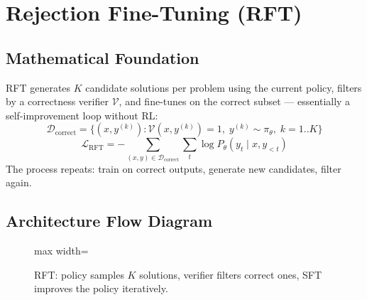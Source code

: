 \documentclass{article}
\begin{document}
\newpage
\section{Rejection Fine-Tuning (RFT)}

\subsection{Mathematical Foundation}
RFT generates $K$ candidate solutions per problem using the current policy, filters by a correctness verifier $\mathcal{V}$, and fine-tunes on the correct subset — essentially a self-improvement loop without RL:
\begin{equation}
  \mathcal{D}_{\text{correct}} = \{(x, y^{(k)}) : \mathcal{V}(x, y^{(k)}) = 1,\; y^{(k)} \sim \pi_\theta,\; k=1..K\}
\end{equation}
\begin{equation}
  \mathcal{L}_{\text{RFT}} = -\sum_{(x,y) \in \mathcal{D}_{\text{correct}}} \sum_t \log P_\theta(y_t \mid x, y_{<t})
\end{equation}
The process repeats: train on correct outputs, generate new candidates, filter again.

\subsection{Architecture Flow Diagram}

\begin{figure}[h]
\centering
\begin{adjustbox}{max width=\linewidth}
\end{adjustbox}
\caption{RFT: policy samples $K$ solutions, verifier filters correct ones, SFT improves the policy iteratively.}
\end{figure}
\end{document}
